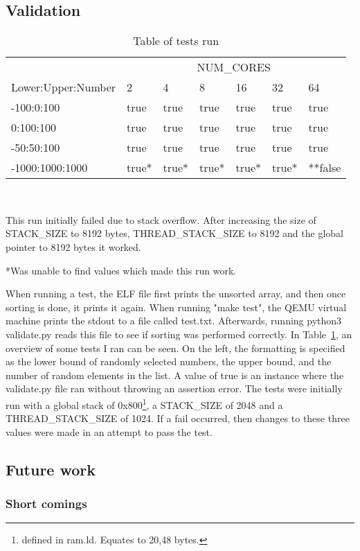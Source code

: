 \subsection{Validation}\label{sec:validate}
\begin{table}
  \caption{Table of tests run}\label{tab:tests}
  \begin{center}
    \begin{tabular}[c]{l|l|l|l|l|l|l}
      & \multicolumn{6}{c}{NUM\_CORES}\\
      \cline{2-7}
      Lower:Upper:Number & 2 & 4 & 8 & 16 & 32 & 64\\
      \hline
      -100:0:100 & true & true & true & true & true & true \\
      \hline
      0:100:100 & true & true & true & true & true & true\\
      \hline
      -50:50:100 & true & true & true & true & true & true \\
      \hline
      -1000:1000:1000 & true* & true* & true* & true* & true* & **false
    \end{tabular} \\
    \vspace{1em}
    \raggedright{\footnotesize *This run initially failed due to stack overflow. After
    increasing the size of STACK\_SIZE to 8192 bytes, THREAD\_STACK\_SIZE to
  8192 and the global pointer to 8192 bytes it worked.} \\
    \raggedright{\footnotesize **Was unable to find values which made this run work.}
  \end{center}
\end{table}

When running a test, the ELF file first prints the unsorted array, and then once
sorting is done, it prints it again. When running "make test", the QEMU virtual
machine prints the stdout to a file called test.txt. Afterwards, running python3
validate.py reads this file to see if sorting was performed correctly. In
Table~\ref{tab:tests}, an overview of some tests I ran can be seen. On the left,
the formatting is specified as the lower bound of randomly selected numbers, the
upper bound, and the number of random elements in the list. A value of true is
an instance where the validate.py file ran without throwing an assertion error.
The tests were initially run with a global stack of 0x800\footnote{defined in
ram.ld. Equates to 20,48 bytes.}, a STACK\_SIZE of 2048 and a
THREAD\_STACK\_SIZE of 1024. If a fail occurred, then changes to these three
values were made in an attempt to pass the test.

\subsection{Future work}
\subsubsection*{Short comings}




